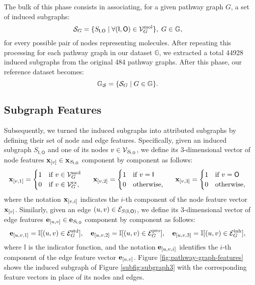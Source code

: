 The bulk of this phase consists in associating, for a given pathway graph $G$, a set of induced subgraphs:
$$\Cal{S}_G = \Set{S_{\mathsf{I},\mathsf{O}} \mid \forall (\mathsf{I},\mathsf{O}) \in \Cal{V}_{G}^{\Fun{mol}}},\; G \in \mathbb{G},$$
for every possible pair of nodes representing molecules. After repeating this processing for each pathway graph in our dataset $\mathbb{G}$, we extracted a total 44928 induced subgraphs from the original 484 pathway graphs. After this phase, our reference dataset becomes:
$$\mathbb{G}_{\Cal{S}} = \Set{\Cal{S}_G \mid G \in \mathbb{G}}.$$

\subsection{Subgraph Features}
Subsequently, we turned the induced subgraphs into attributed subgraphs by defining their set of node and edge features. Specifically, given an induced subgraph $S_{\mathsf{I},\mathsf{O}}$ and one of its nodes $v \in \Cal{V}_{S_{\mathsf{I},\mathsf{O}}}$, we define its 3-dimensional vector of node features $\Elem{x}{v} \in \Vector{x}_{S_{\mathsf{I},\mathsf{O}}}$ component by component as follows:
\begin{align*}
    \Elem{x}{v, 1} = \begin{cases}
        1  & \mathrm{if}\; v \in \Cal{V}_{G}^{\Fun{mol}}\\
        0  & \mathrm{if}\; v \in \Cal{V}_{G}^{\Fun{rx}},
    \end{cases}
    \hspace{1.5em}
    \Elem{x}{v, 2} = \begin{cases}
        1  & \mathrm{if}\; v = \mathsf{I}\\
        0  & \mathrm{otherwise},
    \end{cases}
    \hspace{1.5em}
    \Elem{x}{v, 3} = \begin{cases}
        1  & \mathrm{if}\; v = \mathsf{O}\\
        0  & \mathrm{otherwise},
    \end{cases}
\end{align*}
where the notation $\Elem{x}{v, i}$ indicates the $i$-th component of the node feature vector $\Elem{x}{v}$.
Similarly, given an edge $(u,v) \in \Cal{E}_{S(\mathsf{I},\mathsf{O})}$, we define its 3-dimensional vector of edge features $\Elem{e}{u, v} \in \Vector{e}_{S_{\mathsf{I},\mathsf{O}}}$ component by component as follows:
\begin{align*}
    \Elem{e}{u, v, 1} = \mathbb{I}[(u,v) \in \Cal{E}_{G}^{\Fun{std}}], \quad
    \Elem{e}{u, v, 2} = \mathbb{I}[(u,v) \in \Cal{E}_{G}^{\Fun{pro}}], \quad
    \Elem{e}{u, v, 3} = \mathbb{I}[(u,v) \in \Cal{E}_{G}^{\Fun{inh}}],
\end{align*}
where $\mathbb{I}$ is the indicator function, and the notation $\Elem{e}{u, v, i}$ identifies the $i$-th component of the edge feature vector $\Elem{e}{u, v}$. Figure \ref{fig:pathway-graph-features} shows the induced subgraph of Figure \ref{subfig:subgraph3} with the corresponding feature vectors in place of its nodes and edges.

